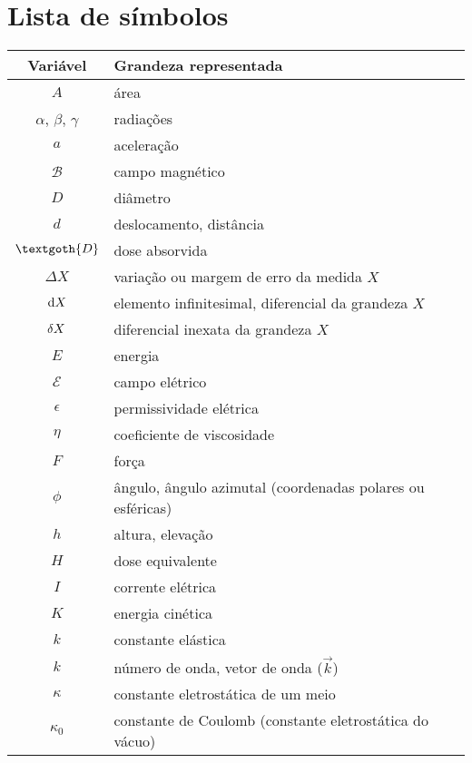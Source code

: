 \chapter*{Lista de símbolos}
\thispagestyle{empty}

\vspace{0.5cm}

\begin{longtable}{|c|l|} %
 \hline
  \textbf{Variável} & \textbf{Grandeza representada} \\ \hline
  $A$ & área \\ \hline
  $\alpha$, $\beta$, $\gamma$ & radiações \\ \hline
  $a$ & aceleração \\ \hline
  $\mathcal{B}$ & campo magnético \\ \hline
  $D$ & diâmetro \\ \hline
  $d$ & deslocamento, distância \\ \hline
  $\textgoth{D}$ & dose absorvida \\ \hline
  $\Delta{X}$ & variação ou margem de erro da medida $X$ \\ \hline
  $\mathrm{d}{X}$ & elemento infinitesimal, diferencial da grandeza $X$ \\ \hline
  ${\delta}{X}$ & diferencial inexata da grandeza $X$ \\ \hline
  $E$ & energia \\ \hline
  $\mathcal{E}$ & campo elétrico \\ \hline
  $\epsilon$  & permissividade elétrica \\ \hline
  $\eta$ & coeficiente de viscosidade \\ \hline
  $F$ & força \\ \hline
  $\phi$   & ângulo, ângulo azimutal (coordenadas polares ou esféricas) \\ \hline
  $h$ & altura, elevação \\ \hline
  $H$ & dose equivalente \\ \hline
  $I$ & corrente elétrica \\ \hline
  $K$ & energia cinética \\ \hline
  $k$ & constante elástica \\ \hline
  $k$ & número de onda, vetor de onda ($\vec{k}$) \\ \hline
  $\kappa$ & constante eletrostática de um meio \\ \hline
  $\kappa_0$ & constante de Coulomb (constante eletrostática do vácuo) \\ \hline

\end{longtable}
